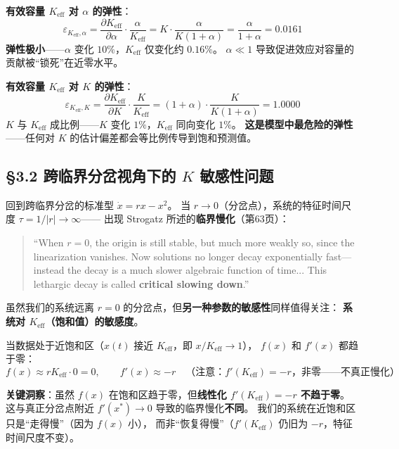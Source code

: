 \documentclass[12pt,a4paper]{article}
\begin{document}
\textbf{有效容量 $K_{\text{eff}}$ 对 $\alpha$ 的弹性}：
\begin{equation}
\varepsilon_{K_{\text{eff}}, \alpha} = \frac{\partial K_{\text{eff}}}{\partial \alpha}
\cdot \frac{\alpha}{K_{\text{eff}}}
= K \cdot \frac{\alpha}{K(1+\alpha)} = \frac{\alpha}{1+\alpha} = 0.0161
\end{equation}
\textbf{弹性极小}——$\alpha$ 变化 $10\%$，$K_{\text{eff}}$ 仅变化约 $0.16\%$。
$\alpha \ll 1$ 导致促进效应对容量的贡献被``锁死''在近零水平。

\textbf{有效容量 $K_{\text{eff}}$ 对 $K$ 的弹性}：
\begin{equation}
\varepsilon_{K_{\text{eff}}, K} = \frac{\partial K_{\text{eff}}}{\partial K}
\cdot \frac{K}{K_{\text{eff}}}
= (1+\alpha) \cdot \frac{K}{K(1+\alpha)} = 1.0000
\end{equation}
$K$ 与 $K_{\text{eff}}$ 成比例——$K$ 变化 $1\%$，$K_{\text{eff}}$ 同向变化 $1\%$。
\textbf{这是模型中最危险的弹性}——任何对 $K$ 的估计偏差都会等比例传导到饱和预测值。

\subsection{\S3.2 跨临界分岔视角下的 $K$ 敏感性问题}

回到跨临界分岔的标准型 $\dot{x} = r x - x^2$。
当 $r \to 0$（分岔点），系统的特征时间尺度 $\tau = 1/|r| \to \infty$——
出现 Strogatz 所述的\textbf{临界慢化}（第63页）：

\begin{quote}
\small
``When $r = 0$, the origin is still stable, but much more weakly so, since the linearization
vanishes. Now solutions no longer decay exponentially fast—instead the decay is a much slower
algebraic function of time... This lethargic decay is called \textbf{critical slowing down}.''
\end{quote}

虽然我们的系统远离 $r = 0$ 的分岔点，但\textbf{另一种参数的敏感性}同样值得关注：
\textbf{系统对 $K_{\text{eff}}$（饱和值）的敏感度}。

当数据处于近饱和区（$x(t)$ 接近 $K_{\text{eff}}$，即 $x/K_{\text{eff}} \to 1$），
$f(x)$ 和 $f'(x)$ 都趋于零：
\begin{equation}
f(x) \approx r K_{\text{eff}} \cdot 0 = 0, \qquad
f'(x) \approx -r \quad \text{（注意：$f'(K_{\text{eff}}) = -r$，非零——不真正慢化）}
\end{equation}

\textbf{关键洞察}：虽然 $f(x)$ 在饱和区趋于零，但\textbf{线性化 $f'(K_{\text{eff}}) = -r$ 不趋于零}。
这与真正分岔点附近 $f'(x^*) \to 0$ 导致的临界慢化\textbf{不同}。
我们的系统在近饱和区只是``走得慢''（因为 $f(x)$ 小），
而非``恢复得慢''（$f'(K_{\text{eff}})$ 仍旧为 $-r$，特征时间尺度不变）。
\end{document}
